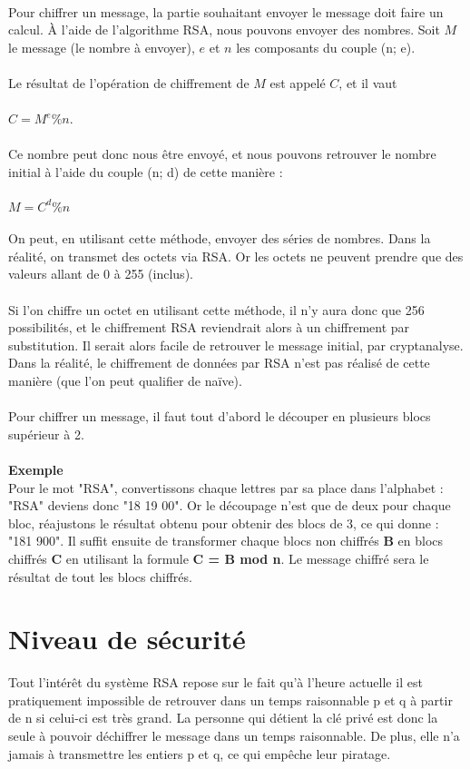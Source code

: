 		\\
		Pour chiffrer un message, la partie souhaitant envoyer le message doit faire un calcul. À l'aide de l'algorithme RSA, nous pouvons envoyer des nombres. Soit $M$ le message (le nombre à envoyer), $e$ et $n$ les composants du couple (n; e).\\
		\\
		Le résultat de l'opération de chiffrement de $M$ est appelé $C$, et il vaut\\
		\\
		$C = M^e \% n$.\\
		\\
		Ce nombre peut donc nous être envoyé, et nous pouvons retrouver le nombre initial à l'aide du couple (n; d) de cette manière :\\
		\\
		$M = C^d \% n$\\
		\\
		On peut, en utilisant cette méthode, envoyer des séries de nombres. Dans la réalité, on transmet des octets via RSA. Or les octets ne peuvent prendre que des valeurs allant de 0 à 255 (inclus).\\
		\\
		Si l'on chiffre un octet en utilisant cette méthode, il n'y aura donc que 256 possibilités, et le chiffrement RSA reviendrait alors à un chiffrement par substitution. Il serait alors facile de retrouver le message initial, par cryptanalyse.\\
		Dans la réalité, le chiffrement de données par RSA n'est pas réalisé de cette manière (que l'on peut qualifier de naïve).\\
		\\
		Pour chiffrer un message, il faut tout d'abord le découper en plusieurs blocs supérieur à 2.
		\\\\\textbf{Exemple}\\
		Pour le mot "RSA", convertissons chaque lettres par sa place dans l’alphabet : "RSA" deviens donc "18 19 00". Or le découpage n'est que de deux pour chaque bloc, réajustons le résultat obtenu pour obtenir des blocs de 3, ce qui donne : "181 900". Il suffit ensuite de transformer chaque blocs non chiffrés \textbf{B} en blocs chiffrés \textbf{C} en utilisant la formule \textbf{C = B mod n}. Le message chiffré sera le résultat de tout les blocs chiffrés. 
	\section{Niveau de sécurité}
		Tout l'intérêt du système RSA repose sur le fait qu'à l'heure actuelle il est pratiquement impossible de retrouver dans un temps raisonnable p et q à partir de n si celui-ci est très grand. La personne qui détient la clé privé est donc la seule à pouvoir déchiffrer le message dans un temps raisonnable. De plus, elle n'a jamais à transmettre les entiers p et q, ce qui empêche leur piratage.
		
